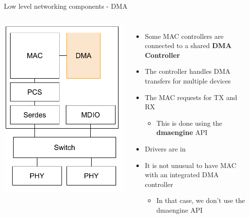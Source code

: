 \begin{frame}{Low level networking components - DMA}
	\begin{columns}
			\includegraphics[width=\textwidth]{slides/networking-driver-overview/net_components_dma.pdf}
		\begin{itemize}
			\item Some MAC controllers are connected to a shared \textbf{DMA Controller}
			\item The controller handles DMA transfers for multiple devices
			\item The MAC requests  for TX and RX
				\begin{itemize}
					\item This is done using the \textbf{dmaengine} API
				\end{itemize}
			\item Drivers are in 
			\item It is not unusual to have MAC with an integrated DMA controller
				\begin{itemize}
					\item In that case, we don't use the dmaengine API
				\end{itemize}
		\end{itemize}
	\end{columns}
\end{frame}

